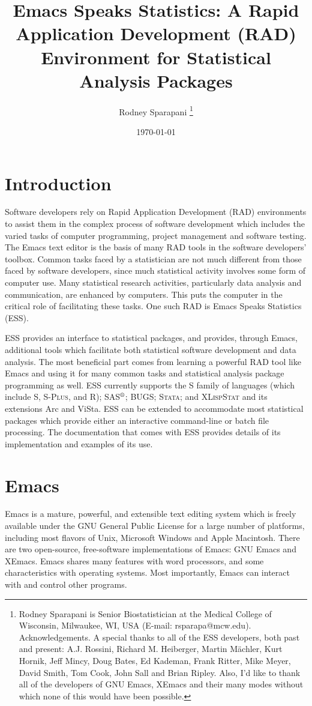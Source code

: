 \documentclass{article}
\title{Emacs Speaks Statistics:  A Rapid Application Development (RAD)
  Environment for Statistical Analysis Packages}
\author{Rodney Sparapani \footnote{%
Rodney Sparapani is Senior Biostatistician at the Medical College
of Wisconsin, Milwaukee, WI, USA (E-mail: rsparapa@mcw.edu).
Acknowledgements.  A special thanks to all of the ESS developers, both past
    and present:  A.J. Rossini, Richard M. Heiberger, Martin M{\"a}chler, 
    Kurt Hornik, Jeff Mincy, Doug Bates, Ed Kademan, Frank Ritter, Mike Meyer, 
    David Smith, Tom Cook, John Sall and Brian Ripley.  Also, I'd like to thank
    all of the developers of GNU Emacs, XEmacs and their many modes without which
    none of this would have been possible.}}
\date{\today}
\newcommand{\SAS}{\textsc{SAS}$^{\mbox{\scriptsize\textregistered}}$}
\newcommand{\Splus}{\textsc{S-Plus}}
\newcommand*{\XLispStat}{\textsc{XLispStat}}
\newcommand*{\Stata}{\textsc{Stata}}
\begin{document}
\maketitle

\section{Introduction}
\label{sec:introduction}

Software developers rely on Rapid Application Development (RAD)
environments to assist them in the complex process of software
development which includes the varied tasks of computer
programming, project management and software testing.  The Emacs text
editor is the basis of many RAD tools in the software developers' toolbox.
Common tasks faced by a statistician are not much different from those
faced by software developers, since much statistical
activity involves some form of computer use.  Many
statistical research activities, particularly data analysis and
communication, are enhanced by computers.  This puts the computer
in the critical role of facilitating these
tasks.  One such RAD is Emacs Speaks Statistics (ESS).

ESS provides an interface to statistical packages, and provides,
through Emacs, additional tools which facilitate both statistical
software development and data analysis.  The most beneficial part  
comes from learning a powerful RAD tool like Emacs and using it for 
many common tasks and statistical analysis package programming as well. 
ESS currently supports the S family of languages (which include
S, \Splus, and R); \SAS;  BUGS; \Stata; and \XLispStat
and its extensions Arc and ViSta.  ESS can be
extended to accommodate most statistical packages which provide either
an interactive command-line or batch file processing.  The documentation 
that comes with ESS provides details of its implementation and examples 
of its use.


\section{Emacs}
\label{sec:emacs}

Emacs is a mature, powerful, and extensible text editing system which
is freely available under the GNU General Public License for a large
number of platforms, including most flavors of Unix, Microsoft Windows
and Apple Macintosh.  There are two open-source, free-software
implementations of Emacs:  GNU Emacs and XEmacs.
Emacs shares many features with
word processors, and some characteristics with operating systems.
Most importantly, Emacs can interact with and control other programs.
\end{document}
